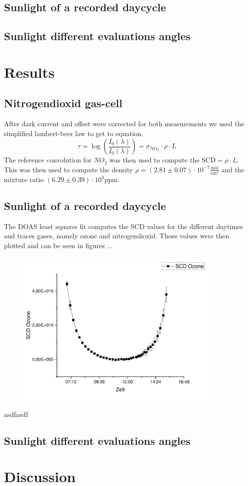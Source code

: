 \documentclass[12pt, english]{scrartcl} %
\begin{document}
\begin{multicols}{2}
\subsection{Sunlight of a recorded daycycle}

\subsection{Sunlight different evaluations angles}

\section{Results}
\subsection{Nitrogendioxid gas-cell}
After dark current and offset were corrected for both measurements we used the simplified lambert-beer law to get to equation.
\begin{equation}
\tau = \log(\frac{I_0(\lambda)}{I_0(\lambda)})= \sigma_{NO_2} \cdot \rho \cdot L
\end{equation}
The reference convolution for $NO_2$ was then used to compute the SCD$= \rho \cdot L$. This was then used to compute the density $\rho = (2.81 \pm 0.07 ) \cdot 10^{-7} \frac{\text{mol}}{\text{cm}^3}$ and the mixture ratio $(6.29 \pm 0.39) \cdot 10^3 \text{ppm}$.


\subsection{Sunlight of a recorded daycycle}
The DOAS least squares fit computes the SCD values for the different daytimes and traces gases, namely ozone and nitrogendioxid. Those values were then plotted and can be seen in figures ...
\begin{figure}
\includegraphics[width= 0.9\textwidth]{graphics/o3scd.pdf}
\end{figure}
asdfasdf

\subsection{Sunlight different evaluations angles}


\section{Discussion}
\end{multicols}
\end{document}
